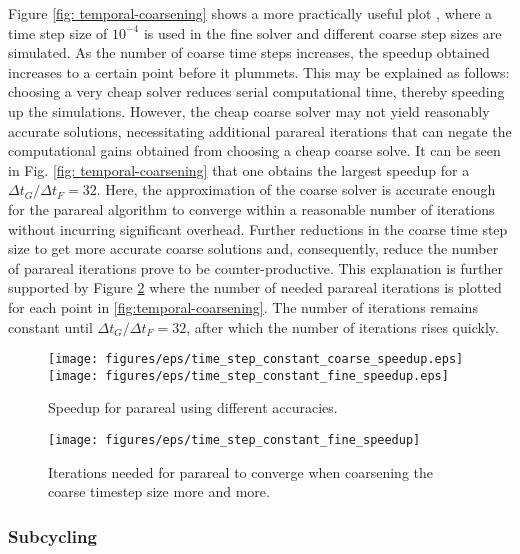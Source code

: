 Figure \ref{fig: temporal-coarsening} shows a more practically useful plot , where a time step size of $10^{-4}$ is used in the fine solver and different coarse step sizes are simulated. As the number of coarse time steps increases, the speedup obtained increases to a certain point before it plummets. This may be explained as follows: choosing a very cheap solver reduces serial computational time, thereby speeding up the simulations. However, the cheap coarse solver may not yield reasonably accurate solutions, necessitating additional parareal iterations that can negate the computational gains obtained from choosing a cheap coarse solve. It can be seen in Fig. \ref{fig: temporal-coarsening} that one obtains the largest speedup for a $\Delta t_G/\Delta t_F = 32$. Here, the approximation of the coarse solver is accurate enough for the parareal algorithm to converge within a reasonable number of iterations without incurring significant overhead. Further reductions in the coarse time step size to get more accurate coarse solutions and, consequently, reduce the number of parareal iterations prove to be counter-productive. This explanation is further supported by Figure \ref{fig: temporal-coarsening-iterations} where the number of needed parareal iterations is plotted for each point in \ref{fig:temporal-coarsening}. The number of iterations remains constant until $\Delta t_G/\Delta t_F = 32$, after which the number of iterations rises quickly.
 \begin{figure}[h]
    \centering
    \texttt{[image: figures/eps/time\_step\_constant\_coarse\_speedup.eps]}
    \texttt{[image: figures/eps/time\_step\_constant\_fine\_speedup.eps]}
    \caption{Speedup for parareal using different accuracies.}
    \label{fig: temporal-coarsening-speedup}
\end{figure}
 \begin{figure}[h]
    \centering
    \texttt{[image: figures/eps/time\_step\_constant\_fine\_speedup]}
    \caption{Iterations needed for parareal to converge when coarsening the coarse timestep size more and more.}
    \label{fig: temporal-coarsening-iterations}
\end{figure}

\subsubsection{Subcycling}
\label{sub: subcycling}

